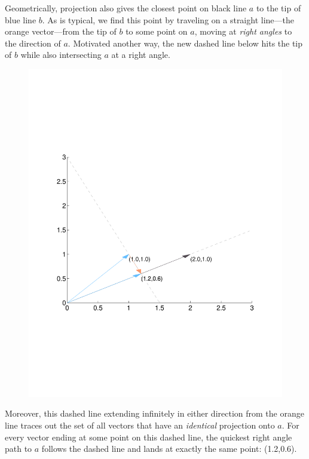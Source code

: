 \documentclass[12pt]{article}
\theoremstyle{plain}
\theoremstyle{definition}
\theoremstyle{remark}
\begin{document}
Geometrically, projection also gives the closest point on black line $a$
to the tip of blue line $b$. As is typical, we find this point by
traveling on a straight line---the orange vector---from the tip of $b$
to some point on $a$, moving at \emph{right angles} to the direction of
$a$.  Motivated another way, the new dashed line below hits the tip of
$b$ while also intersecting $a$ at a right angle.
\begin{figure}[htpb!]
  \centering
  \includegraphics[scale=0.4, trim={2cm, 7.2cm, 2cm, 7.2cm}, clip]{Plots/StateSpaceGeometry4.pdf}
\end{figure}

\clearpage
Moreover, this dashed line extending infinitely in either direction from
the orange line traces out the set of all vectors that have an
\emph{identical} projection onto $a$. For every vector ending at some
point on this dashed line, the quickest right angle path to $a$ follows
the dashed line and lands at exactly the same point: (1.2,0.6).
\end{document}
